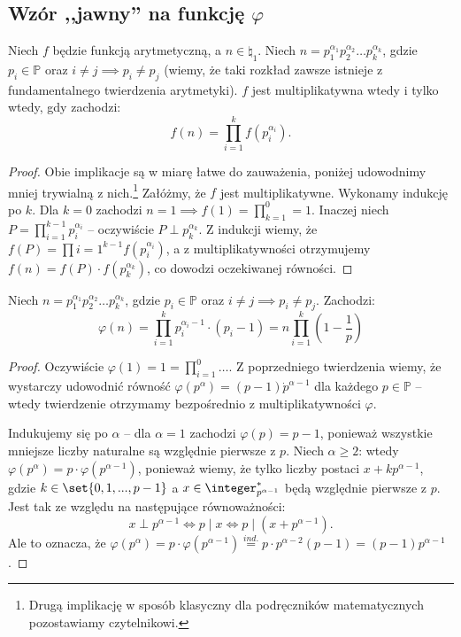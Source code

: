 \subsection{Wzór ,,jawny'' na funkcję \texorpdfstring{$\varphi$}{phi}}
\begin{theorem}
	\label{nt:closedmulti}
	Niech $f$ będzie funkcją arytmetyczną, a $n \in \natural_1$.
	Niech $n = p_1^{\alpha_1}p_2^{\alpha_2}\ldots p_k^{\alpha_k}$, gdzie
	$p_i \in \mathbb P$ oraz $i \neq j \implies p_i \neq p_j$ (wiemy, że taki rozkład zawsze istnieje z fundamentalnego twierdzenia arytmetyki).
	$f$ jest multiplikatywna wtedy i tylko wtedy, gdy zachodzi:
	\begin{equation*}
		f(n) = \prod_{i=1}^{k} f(p_i^{\alpha_i}).
	\end{equation*}
\end{theorem}
\begin{proof}
	Obie implikacje są w miarę łatwe do zauważenia, poniżej udowodnimy mniej trywialną z nich.\footnote{Drugą implikację w sposób klasyczny dla podręczników matematycznych pozostawiamy czytelnikowi.}
	Załóżmy, że $f$ jest multiplikatywne. Wykonamy indukcję po $k$. Dla $k = 0$ zachodzi $n = 1 \implies f(1) = \prod_{k=1}^{0} = 1$.
	Inaczej niech $P = \prod_{i=1}^{k-1} p_i^{\alpha_i}$ -- oczywiście $P \perp p_k^{\alpha_k}$.
	Z indukcji wiemy, że $f(P) = \prod{i=1}^{k-1} f(p_i^{\alpha_i})$, a z multiplikatywności
	otrzymujemy $f(n) = f(P) \cdot f(p_k^{\alpha_k})$, co dowodzi oczekiwanej równości.
\end{proof}

\begin{corollary}
	Niech $n = p_1^{\alpha_1}p_2^{\alpha_2}\ldots p_k^{\alpha_k}$, gdzie $p_i \in \mathbb P$ oraz $i \neq j \implies p_i \neq p_j$.
	Zachodzi:
	\begin{equation*}
		\varphi(n) = \prod_{i=1}^{k} p_i^{\alpha_i-1} \cdot (p_i-1) = n \prod_{i=1}^{k} (1-\frac{1}{p})
	\end{equation*}
\end{corollary}
\begin{proof}
	Oczywiście $\varphi(1) = 1 = \prod_{i=1}^{0} \dots$.
	Z poprzedniego twierdzenia wiemy, że wystarczy udowodnić równość $\varphi(p^{\alpha}) = (p-1) \dot p^{\alpha-1}$ dla każdego $p \in \mathbb P$ -- wtedy twierdzenie otrzymamy bezpośrednio z multiplikatywności $\varphi$.

	Indukujemy się po $\alpha$ -- dla $\alpha = 1$ zachodzi $\varphi(p) = p-1$, ponieważ wszystkie mniejsze liczby naturalne są względnie pierwsze z $p$.
	Niech $\alpha \geq 2$: wtedy $\varphi(p^{\alpha}) = p \cdot \varphi(p^{\alpha-1})$, ponieważ wiemy, że tylko liczby postaci $x + kp^{\alpha-1}$, gdzie $k \in \set{0,1,...,p-1}$ a $x \in \integer_{p^{\alpha-1}}^*$ będą względnie pierwsze z $p$.
	Jest tak ze względu na następujące równoważności:
	$$x \perp p^{\alpha-1} \iff p \mid x \iff p \mid \left(x+p^{\alpha-1}\right).$$
	Ale to oznacza, że $\varphi(p^{\alpha}) = p\cdot\varphi(p^{\alpha-1}) \stackrel{ind.}{=} p\cdot p^{\alpha-2}(p-1) = (p-1)p^{\alpha-1}$.
\end{proof}
